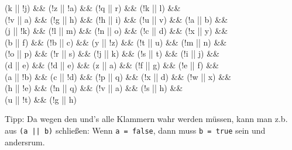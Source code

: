 \documentclass{../../sheet}
\begin{document}
\begin{enumerate}
\begin{enumerate}
\begin{ausgabe}
{                            (k || !j) \&\&
                            (!z || !a) \&\&
                            (!q || r) \&\&
                            (!k || l) \&\&\\
                            (!v || a) \&\&
                            (!g || h) \&\&
                            (!h || i) \&\&
                            (!u || v) \&\&
                            (!a || b) \&\&\\
                            (j || !k) \&\&
                            (!l || m) \&\&
                            (!n || o) \&\&
                            (!c || d) \&\&
                            (!x || y) \&\&\\
                            (b || f) \&\&
                            (!b || c) \&\&
                            (y || !z) \&\&
                            (!t || u) \&\&
                            (!m || n) \&\&\\
                            (!o || p) \&\&
                            (!r || s) \&\&
                            (!j || k) \&\&
                            (!s || t) \&\&
                            (!i || j) \&\&\\
                            (d || e) \&\&
                            (!d || e) \&\&
                            (z || a) \&\&
                            (!f || g) \&\&
                            (!e || f) \&\&\\
                            (a || !b) \&\&
                            (c || !d) \&\&
                            (!p || q) \&\&
                            (!x || d) \&\&
                            (!w || x) \&\&\\
                            (h || !e) \&\&
                            (!n || q) \&\&
                            (!v || a) \&\&
                            (!s || h) \&\&\\
                            (u || !t) \&\&
                            (!g || h)}
                    \end{ausgabe} %
                    Tipp: Da wegen den und's alle Klammern wahr werden müssen, kann man z.b. aus \texttt{(a || b)} schließen: Wenn \texttt{a = false}, dann muss \texttt{b = true} sein und andersrum.
          \end{enumerate}
\end{enumerate}
\end{document}
